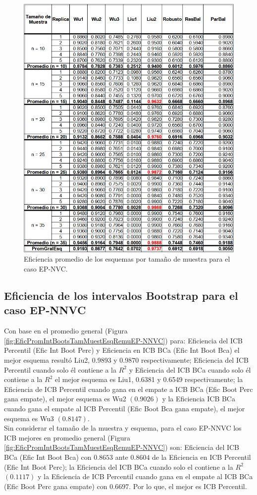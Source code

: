 \begin{figure}[H] 
	\centering 
	\includegraphics[width=0.70\linewidth]{img/EP_NVC_Efic_Esq.png} 
	\caption{Eficiencia promedio de los esquemas por tamaño de muestra para el caso EP-NVC.} 
	\label{fig:EficPromEsqTamMuesEsqRemuEP-NVC}
\end{figure}

\FloatBarrier

\subsection{Eficiencia de los intervalos Bootstrap para el caso EP-NNVC}
Con base en el promedio general (Figura \ref{fig:EficPromIntBootsTamMuestEsqRemuEP-NNVC}) para: Eficiencia del ICB Percentil (Efic Int Boot Perc) y Eficiencia en ICB BCa (Efic Int Boot Bca) el mejor esquema resultó Liu2, 0.9893 y 0.9870 respectivamente;
Eficiencia del ICB Percentil cuando solo él contiene a la $R^{2}$ y Eficiencia del ICB BCa cuando solo él contiene a la $R^{2}$ el mejor esquema es Liu1, 0.6381 y 0.6549 respectivamente; 
la Eficiencia de ICB Percentil cuando gana en el empate a ICB BCa (Efic Boot Perc gana empate), el mejor esquema es Wu2 $(0.9026)$ y la Eficiencia ICB BCa cuando gana el empate al ICB Percentil (Efic Boot Bca gana empate), el mejor esquema es Wu3 $(0.8147)$.\\


Sin considerar el tamaño de la muestra y esquema, para el caso EP-NNVC los ICB mejores en promedio general  (Figura \ref{fig:EficPromIntBootsTamMuestEsqRemuEP-NNVC}) son: Eficiencia del ICB BCa (Efic Int Boot Bca) con $0.8653$ ante $0.8604$ de la Eficiencia en ICB Percentil (Efic Int Boot Perc); la Eficiencia del ICB BCa cuando solo el contiene a la $R^{2}$ $(0.1117)$ y la Eficiencia de ICB Percentil cuando gana en el empate al ICB BCa (Efic Boot Perc gana empate) con $0.6697$. Por lo que, el mejor es ICB Percentil.




